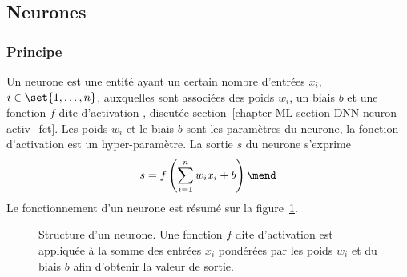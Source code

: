 \subsection{Neurones}\label{chapter-ML-section-DNN-neuron}
\subsubsection{Principe}
Un neurone est une entité ayant
un certain nombre d'entrées $x_i$, $i\in\set{1,\ldots,n}$,
auxquelles sont associées des poids $w_i$,
un biais $b$
et
une fonction $f$ dite d'\og activation \fg, discutée section~\ref{chapter-ML-section-DNN-neuron-activ_fct}.
Les poids $w_i$ et le biais $b$ sont les paramètres du neurone,
la fonction d'activation est un hyper-paramètre.
La sortie $s$ du neurone s'exprime
\begin{equation}
s = f\left(\sum_{i=1}^n w_ix_i + b\right)
\mend
\end{equation}
Le fonctionnement d'un neurone est résumé sur la figure~\ref{fig-chapter-ML-section-DNN-neuron-neuron_structure}.
\begin{figure}[h]
\centering

\caption[Structure d'un neurone.]{Structure d'un neurone. Une fonction $f$ dite d'\og activation \fg{} est appliquée à la somme des entrées $x_i$ pondérées par les poids $w_i$ et du biais $b$ afin d'obtenir la valeur de sortie.}
\label{fig-chapter-ML-section-DNN-neuron-neuron_structure}
\end{figure}
